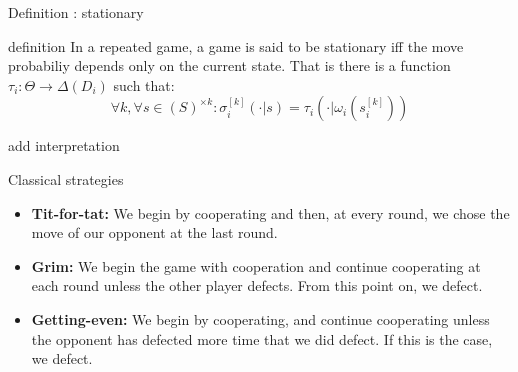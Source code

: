 \begin{frame}{Definition : stationary}

\begin{block}{definition}
In a repeated game, a game is said to be {\color{green}stationary} iff the move probabiliy depends only on the current state. That is there is a function $\tau_i : \Theta \rightarrow \Delta(D_i)$ such that:
\begin{equation*}
	\forall k, \forall s \in (S)^{\times k} : \sigma_i^{[k]}(\cdot | s) = \tau_i(\cdot | \omega_i(s_i^{[k]}))
\end{equation*}
\end{block}

\alert{add interpretation}

\end{frame}

\begin{frame}{Classical strategies}
\begin{itemize}
	\item \textbf{Tit-for-tat:} We begin by cooperating and then, at every round, we chose the move of our opponent at the last round.
	\item \textbf{Grim:} We begin the game with cooperation and continue cooperating at each round unless the other player defects. From this point on, we defect.
	\item \textbf{Getting-even:} We begin by cooperating, and continue cooperating unless the opponent has defected more time that we did defect. If this is the case, we defect.
\end{itemize}
\end{frame}

